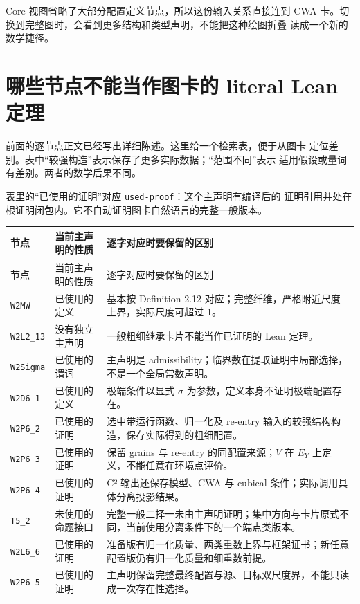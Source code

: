 \documentclass[UTF8,11pt,a4paper,fontset=none]{ctexart}
\DeclareRobustCommand{\id}[1]{\nolinkurl{#1}}
\begin{document}
Core 视图省略了大部分配置定义节点，所以这份输入关系直接连到 CWA
卡。切换到完整图时，会看到更多结构和类型声明，不能把这种绘图折叠
读成一个新的数学捷径。

\section{哪些节点不能当作图卡的 literal Lean 定理}

前面的逐节点正文已经写出详细陈述。这里给一个检索表，便于从图卡
定位差别。表中“较强构造”表示保存了更多实际数据；“范围不同”表示
适用假设或量词有差别。两者的数学后果不同。

表里的“已使用的证明”对应 \id{used-proof}：这个主声明有编译后的
证明引用并处在根证明闭包内。它不自动证明图卡自然语言的完整一般版本。

\begin{longtable}{@{}>{\raggedright\arraybackslash}p{26mm}>{\raggedright\arraybackslash}p{27mm}>{\raggedright\arraybackslash}p{96mm}@{}}
\toprule
节点 & 当前主声明的性质 & 逐字对应时要保留的区别\\
\midrule
\endfirsthead
\toprule 节点 & 当前主声明的性质 & 逐字对应时要保留的区别\\\midrule
\endhead
\id{W2MW} & 已使用的定义 & 基本按 Definition 2.12 对应；完整纤维，严格附近尺度上界，实际尺度可超过 1。\\
\id{W2L2_13} & 没有独立主声明 & 一般粗细继承卡片不能当作已证明的 Lean 定理。\\
\id{W2Sigma} & 已使用的谓词 & 主声明是 admissibility；临界数在提取证明中局部选择，不是一个全局常数声明。\\
\id{W2D6_1} & 已使用的定义 & 极端条件以显式 $\sigma$ 为参数，定义本身不证明极端配置存在。\\
\id{W2P6_2} & 已使用的证明 & 选中带运行函数、归一化及 re-entry 输入的较强结构构造，保存实际得到的粗细配置。\\
\id{W2P6_3} & 已使用的证明 & 保留 grains 与 re-entry 的同配置来源；$V$ 在 $E_Y$ 上定义，不能任意在环境点评价。\\
\id{W2P6_4} & 已使用的证明 & C² 输出还保存模型、CWA 与 cubical 条件；实际调用具体分离投影结果。\\
\id{T5_2} & 未使用的命题接口 & 完整一般二择一未由主声明证明；集中方向与卡片原式不同，当前使用分离条件下的一个端点类版本。\\
\id{W2L6_6} & 已使用的证明 & 准备版有归一化质量、两类重数上界与框架证书；新任意配置版仍有归一化质量和细重数前提。\\
\id{W2P6_5} & 已使用的证明 & 主声明保留完整最终配置与源、目标双尺度界，不能只读成一次存在性选择。\\

\end{longtable}
\end{document}

